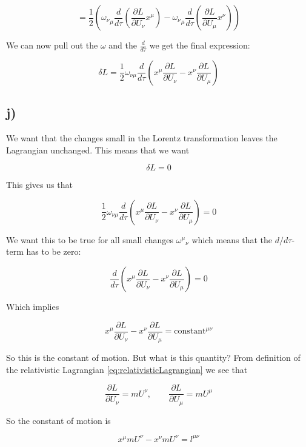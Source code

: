 \documentclass[a4paper,norsk, 10pt]{article}
\begin{document}
$$
= \frac{1}{2}\left({\omega_{\nu}}_{\mu}\frac{d}{d\tau}\left(\frac{\partial L}{\partial U_{\nu}}x^{\mu}\right) - {\omega_{\nu}}_{\mu}\frac{d}{d\tau}\left(\frac{\partial L}{\partial U_{\mu}}x^{\nu}\right)\right)
$$

We can now pull out the $\omega$ and the $\frac{d}{d\tau}$ we get the final expression:

\begin{equation}
\delta L = \frac{1}{2}\omega_{\nu \mu}\frac{d}{d\tau}\left(x^{\mu}\frac{\partial L}{\partial U_{\nu}} - x^{\nu}\frac{\partial L}{\partial U_{\mu}}\right)
\label{eq:finalDeltaL}
\end{equation}



\subsection*{j)}

We want that the changes small in the Lorentz transformation leaves the Lagrangian unchanged. This means that we want 

$$
\delta L = 0
$$

This gives us that 

$$
\frac{1}{2}\omega_{\nu \mu}\frac{d}{d\tau}\left(x^{\mu}\frac{\partial L}{\partial U_{\nu}} - x^{\nu}\frac{\partial L}{\partial U_{\mu}}\right) = 0
$$

We want this to be true for all small changes ${\omega^{\mu}}_{\nu}$ which means that the $d/d\tau$-term has to be zero:

$$
\frac{d}{d\tau}\left(x^{\mu}\frac{\partial L}{\partial U_{\nu}} - x^{\nu}\frac{\partial L}{\partial U_{\mu}}\right) = 0
$$

Which implies

\begin{equation}
x^{\mu}\frac{\partial L}{\partial U_{\nu}} - x^{\nu}\frac{\partial L}{\partial U_{\mu}} = \text{constant}^{\mu \nu}
\end{equation}


So this is the constant of motion. But what is this quantity? From definition of the relativistic Lagrangian \eqref{eq:relativisticLagrangian} we see that

$$
\frac{\partial L}{\partial U_{\nu}}  = mU^{\nu}, \qquad \frac{\partial L}{\partial U_{\mu}}  = mU^{\mu}
$$

So the constant of motion is

\begin{equation}
x^{\mu}mU^{\nu} - x^{\nu}mU^{\nu} = l^{\mu \nu}
\end{equation}
\end{document}
